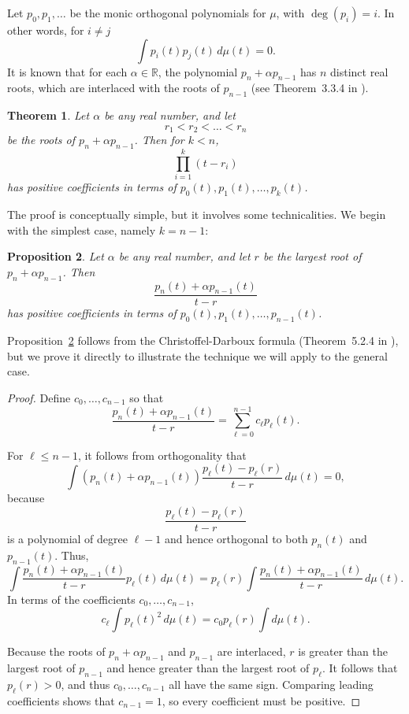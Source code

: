 \documentclass{jams-l}
\theoremstyle{plain}
\newtheorem{theorem}{Theorem}
\newtheorem{proposition}[theorem]{Proposition}
\numberwithin{theorem}{section}
\theoremstyle{definition}
\numberwithin{equation}{section}
\newcommand{\R}{{\mathbb R}}
\begin{document}
Let $p_0,p_1,\dots$ be the monic orthogonal polynomials for $\mu$,
with $\deg(p_i)=i$.  In other words, for $i \ne j$
$$
\int p_i(t) p_j(t) \, d\mu(t) = 0.
$$
It is known that for each $\alpha \in \R$, the polynomial $p_n +
\alpha p_{n-1}$ has $n$ distinct real roots, which are interlaced
with the roots of $p_{n-1}$ (see Theorem~3.3.4 in \cite{Sz}).

\begin{theorem} \label{theorem:orthog}
Let $\alpha$ be any real number, and let
$$
r_1 < r_2 < \dots < r_n
$$
be the roots of $p_n + \alpha p_{n-1}$.  Then for $k < n$,
$$
\prod_{i=1}^k (t-r_i)
$$
has positive coefficients in terms of
$p_0(t),p_1(t),\dots,p_k(t)$.
\end{theorem}

The proof is conceptually simple, but it involves some
technicalities.  We begin with the simplest case, namely $k=n-1$:

\begin{proposition} \label{prop:basecase}
Let $\alpha$ be any real number, and let $r$ be the largest root
of $p_n + \alpha p_{n-1}$.  Then
$$
\frac{p_n(t) + \alpha p_{n-1}(t)}{t-r}
$$
has positive coefficients in terms of
$p_0(t),p_1(t),\dots,p_{n-1}(t)$.
\end{proposition}

Proposition~\ref{prop:basecase} follows from the
Christoffel-Darboux formula (Theorem~5.2.4 in \cite{AAR}), but we
prove it directly to illustrate the technique we will apply to the
general case.

\begin{proof}
Define $c_0,\dots,c_{n-1}$ so that
$$
\frac{p_n(t) + \alpha p_{n-1}(t)}{t-r} = \sum_{\ell=0}^{n-1}
c_\ell p_\ell(t).
$$

For $\ell \le n-1$, it follows from orthogonality that
$$
\int (p_n(t) + \alpha p_{n-1}(t)) \frac{p_\ell(t) - p_\ell(r)}{t -
r} \, d\mu(t) = 0,
$$
because
$$
\frac{p_\ell(t) - p_\ell(r)}{t - r}
$$
is a polynomial of degree $\ell-1$ and hence orthogonal to both
$p_n(t)$ and $p_{n-1}(t)$. Thus,
$$
\int \frac{p_n(t) + \alpha p_{n-1}(t)}{t - r}p_\ell(t) \, d\mu(t)
= p_\ell(r) \int \frac{p_n(t) + \alpha p_{n-1}(t)}{t - r} \,
d\mu(t).
$$
In terms of the coefficients $c_0,\dots,c_{n-1}$,
$$
c_\ell \int p_\ell(t)^2 \, d\mu(t) = c_0 p_\ell(r)  \int d\mu(t).
$$

Because the roots of $p_n+\alpha p_{n-1}$ and $p_{n-1}$ are
interlaced, $r$ is greater than the largest root of $p_{n-1}$ and
hence greater than the largest root of $p_\ell$. It follows that
$p_\ell(r)>0$, and thus $c_0,\dots,c_{n-1}$ all have the same
sign. Comparing leading coefficients shows that $c_{n-1}=1$, so
every coefficient must be positive.
\end{proof}
\end{document}
